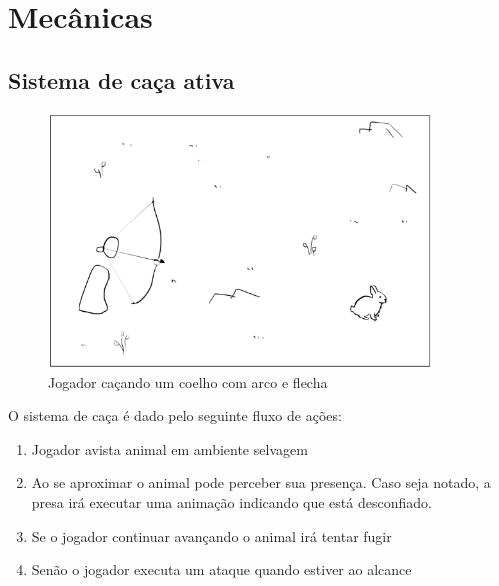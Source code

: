 \documentclass[12pt, 
openright, 
oneside, 
a4paper,    
brazil]{facom-ufu-abntex2}
\begin{document}
\section{Mecânicas}
\subsection{Sistema de caça ativa}
\begin{figure}[H]
	\centering
	\includegraphics[width=4in]{imagens/mecanica_caca.png}
	\caption{Jogador caçando um coelho com arco e flecha}
\end{figure}
O sistema de caça é dado pelo seguinte fluxo de ações:
\begin{enumerate}  
\item Jogador avista animal em ambiente selvagem 
\item Ao se aproximar o animal pode perceber sua presença. Caso seja notado, a presa irá executar uma animação indicando que está desconfiado.
\item Se o jogador continuar avançando o animal irá tentar fugir 
\item Senão o jogador executa um ataque quando estiver ao alcance 
\end{enumerate}
\end{document}
